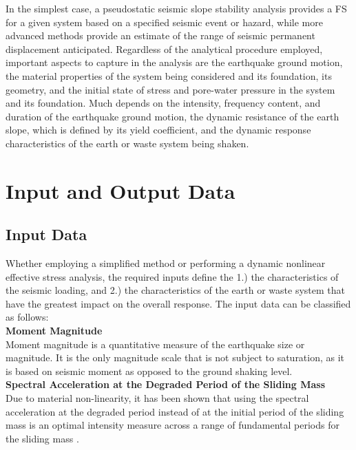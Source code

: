 In the simplest case, a pseudostatic seismic slope stability analysis provides a FS for a given system based on a specified seismic event or hazard, while more advanced methods provide an estimate of the range of seismic permanent displacement anticipated. Regardless of the analytical procedure employed, important aspects to capture in the analysis are the earthquake ground motion, the material properties of the system being considered and its foundation, its geometry, and the initial state of stress and pore-water pressure in the system and its foundation. Much depends on the intensity, frequency content, and duration of the earthquake ground motion, the dynamic resistance of the earth slope, which is defined by its yield coefficient, and the dynamic response characteristics of the earth or waste system being shaken.

\section{Input and Output Data}
\label{sec:eq_landslide_input_output}

\subsection{Input Data}
\label{subsec:eq_landslide_input}
Whether employing a simplified method or performing a dynamic nonlinear effective stress analysis, the required inputs define the 1.) the characteristics of the seismic loading, and 2.) the characteristics of the earth or waste system that have the greatest impact on the overall response. The input data can be classified as follows:\\[0.5em]

\noindent\textbf{Moment Magnitude}\\
Moment magnitude is a quantitative measure of the earthquake size or magnitude. It is the only magnitude scale that is
not subject to saturation, as it is based on seismic moment as opposed to the ground shaking level.\\

\noindent\textbf{Spectral Acceleration at the Degraded Period of the Sliding Mass}\\
Due to material non-linearity, it has been shown that using the spectral acceleration at the degraded period instead of at the initial period of the sliding mass is an optimal intensity measure across a range of fundamental periods for the sliding mass \citep{bray2007simplified}.\\

